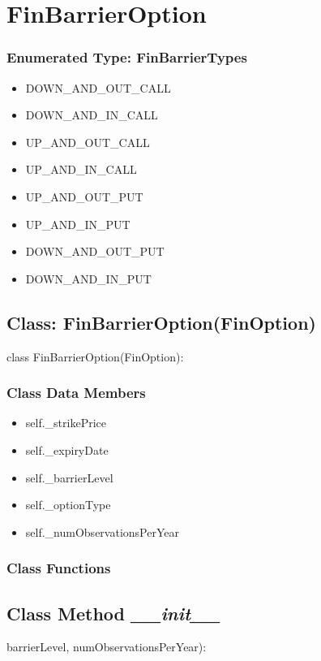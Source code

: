 \documentclass[twoside,11pt]{book}
\begin{document}
\newpage
\section{FinBarrierOption}

\subsubsection{Enumerated Type: FinBarrierTypes}
\begin{itemize}
\item{DOWN\_AND\_OUT\_CALL}
\item{DOWN\_AND\_IN\_CALL}
\item{UP\_AND\_OUT\_CALL}
\item{UP\_AND\_IN\_CALL}
\item{UP\_AND\_OUT\_PUT}
\item{UP\_AND\_IN\_PUT}
\item{DOWN\_AND\_OUT\_PUT}
\item{DOWN\_AND\_IN\_PUT}
\end{itemize}

\subsection{Class: FinBarrierOption(FinOption)}
class FinBarrierOption(FinOption):

\subsubsection{Class Data Members}
\begin{itemize}
\item{self.\_strikePrice}
\item{self.\_expiryDate}
\item{self.\_barrierLevel}
\item{self.\_optionType}
\item{self.\_numObservationsPerYear}
\end{itemize}

\subsubsection{Class Functions}

\subsection{Class Method {\it \_\_init\_\_}}
barrierLevel, numObservationsPerYear):
\end{document}
